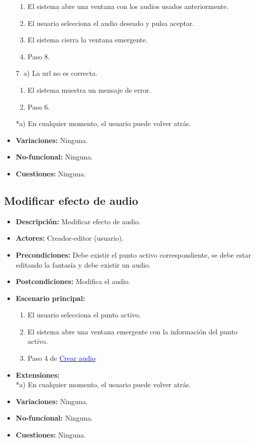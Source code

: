 \begin{itemize}
	\begin{enumerate}
		\item El sistema abre una ventana con los audios usados anteriormente.
		\item El usuario selecciona el audio deseado y pulsa aceptar.
		\item El sistema cierra la ventana emergente.
		\item Paso 8.
	\end{enumerate}
	7. a) La url no es correcta.
	\begin{enumerate}
		\item El sistema muestra un mensaje de error.
		\item Paso 6.
	\end{enumerate}
	*a) En cualquier momento, el usuario puede volver atrás.
	\item \textbf{Variaciones:} Ninguna.
	\item \textbf{No-funcional:} Ninguna.
	\item \textbf{Cuestiones:} Ninguna.
\end{itemize}

\subsection{Modificar efecto de audio}
\begin{itemize}
	\item \textbf{Descripción:} Modificar efecto de audio.
	\item \textbf{Actores:} Creador-editor (usuario).
	\item \textbf{Precondiciones:} Debe existir el punto activo correspondiente, se debe estar editando la fantasía y debe existir un audio.
	\item \textbf{Postcondiciones:} Modifica el audio.
	\item \textbf{Escenario principal:}
	\begin{enumerate}
		\item El usuario selecciona el punto activo.
		\item El sistema abre una ventana emergente con la información del punto activo.
		\item Paso 4 de \hyperlink{crearaudio}{\textcolor{blue}{Crear audio}}
	\end{enumerate}
	\item \textbf{Extensiones:} \\ *a) En cualquier momento, el usuario puede volver atrás.
	\item \textbf{Variaciones:} Ninguna.
	\item \textbf{No-funcional:} Ninguna.
	\item \textbf{Cuestiones:} Ninguna.
\end{itemize}

